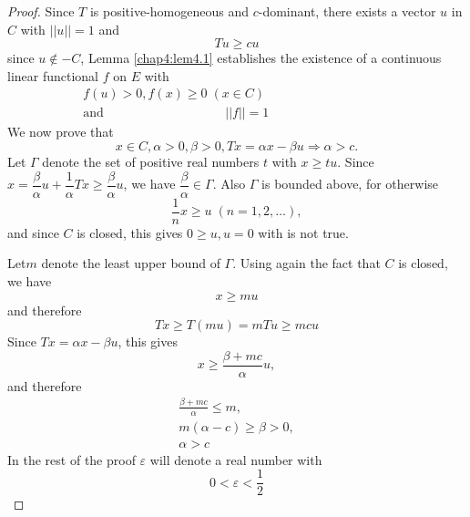 \begin{proof}
  Since $T$ is positive-homogeneous and $c$-dominant, there exists a
  vector $u$ in $C$ with $|| u || = 1$ and  
  \begin{equation}
    Tu \geq cu \tag{1}\label{chap4:eq1}
  \end{equation}
  since $u \notin -C$, Lemma \ref{chap4:lem4.1} establishes the
  existence of a 
  continuous linear functional $f$ on $E$ with 
  \begin{gather*} 
    f (u) > 0, f(x) \geq 0 \; (x \in C) \tag{2}\label{chap4:eq2}\\
 \text{and} \hspace{4cm}
|| f || = 1 \hspace{4cm} \tag{3}\label{chap4:eq3}
  \end{gather*}
  We now prove that
\begin{equation*}
x \in C, \alpha > 0, \beta > 0, Tx = \alpha x -
  \beta u \Rightarrow \alpha > c \tag{4}\label{chap4:eq4}.
\end{equation*}
 Let $\Gamma$ denote the set of 
  positive real numbers $t$ with $x \geq tu$. Since $x =
  \dfrac{\beta}{\alpha} u + \dfrac{1}{\alpha} Tx \geq
  \dfrac{\beta}{\alpha} u$, we have $\dfrac{\beta}{\alpha} \in
  \Gamma$. Also $\Gamma$ is bounded above, for otherwise  
  $$
  \frac{1}{n} x \geq u \; (n=1,2,\ldots),
  $$
  and since $C$ is closed, this gives $0 \geq u, u=0$ with is not true.

Let\pageoriginale $m$ denote the least upper bound of $\Gamma$. Using
again the fact that $C$ is closed, we have   
$$
x \geq mu 
$$
and therefore  
$$
Tx \geq T(mu) = mTu \geq mcu 
$$
Since $Tx = \alpha x - \beta u$, this gives 
$$
x\geq \frac{\beta + mc }{\alpha}u, 
$$
and therefore 
\begin{gather*}
  \frac{\beta+mc }{\alpha }\leq m,\\
  m(\alpha-c) \geq \beta > 0, \\
  \alpha > c 
\end{gather*}
In the rest of the proof $\varepsilon$ will denote a real number with 
\begin{equation}
  0<  \varepsilon < \frac{1}{2} \tag{5}\label{chap4:eq5}
\end{equation}


\end{proof}
